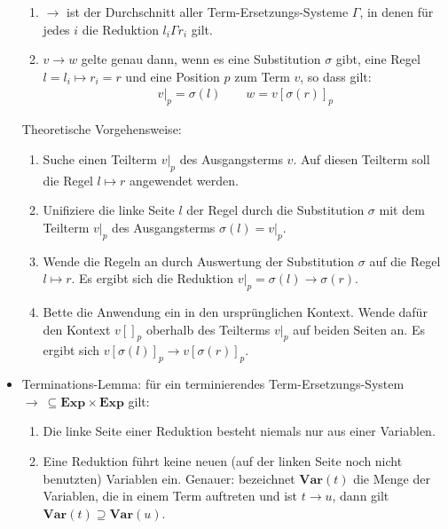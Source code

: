 \documentclass[
  a4paper,
  11pt,
]{scrartcl}
\begin{document}
\begin{itemize}
\begin{enumerate}
      \item $\rightarrow$ ist der Durchschnitt aller Term-Ersetzungs-Systeme
        $\Gamma$, in denen für jedes $i$ die Reduktion $l_i \Gamma r_i$ gilt.

      \item $v \rightarrow w$ gelte genau dann, wenn es eine Substitution
        $\sigma$ gibt, eine Regel $l = l_i \mapsto r_i = r$ und eine Position
        $p$ zum Term $v$, so dass gilt:
        \begin{align*}
          {v |}_p = \sigma(l) \qquad w = {v[\sigma(r)]}_p
        \end{align*}
    \end{enumerate}

    Theoretische Vorgehensweise:
    \begin{enumerate}
      \item Suche einen Teilterm ${v |}_p$ des Ausgangsterms $v$. Auf diesen
        Teilterm soll die Regel $l \mapsto r$ angewendet werden.

      \item Unifiziere die linke Seite $l$ der Regel durch die Substitution
        $\sigma$ mit dem Teilterm ${v |}_p$ des Ausgangsterms $\sigma(l) = {v
        |}_p$.

      \item Wende die Regeln an durch Auswertung der Substitution $\sigma$ auf
        die Regel $l \mapsto r$. Es ergibt sich die Reduktion ${v |}_p =
        \sigma(l) \rightarrow \sigma(r)$.

      \item Bette die Anwendung ein in den ursprünglichen Kontext. Wende dafür
        den Kontext ${v[]}_p$ oberhalb des Teilterms ${v |}_p$ auf beiden Seiten
        an. Es ergibt sich ${v[\sigma(l)]}_p \rightarrow {v[\sigma(r)]}_p$.
    \end{enumerate}

  \item Terminations-Lemma: für ein terminierendes Term-Ersetzungs-System
    $\rightarrow \ \subseteq \textbf{Exp} \times \textbf{Exp}$ gilt:
    \begin{enumerate}
      \item Die linke Seite einer Reduktion besteht niemals nur aus einer
        Variablen.
      \item Eine Reduktion führt keine neuen (auf der linken Seite noch nicht
        benutzten) Variablen ein. Genauer: bezeichnet $\textbf{Var}(t)$ die
        Menge der Variablen, die in einem Term auftreten und ist $t \rightarrow
        u$, dann gilt $\textbf{Var}(t) \supseteq \textbf{Var}(u)$.
    \end{enumerate}


\end{itemize}
\end{document}
